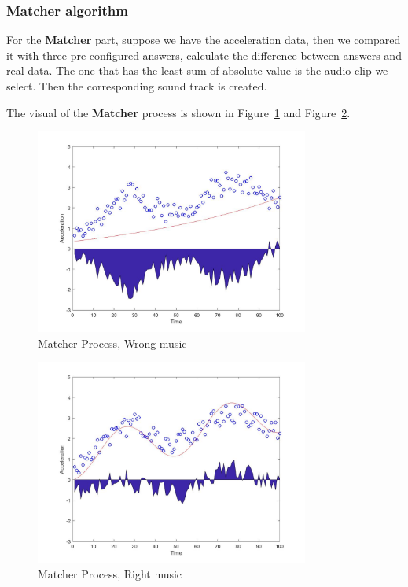 \subsubsection{Matcher algorithm}

For the \textbf{Matcher} part, suppose we have the acceleration data, then we
compared it with three pre-configured answers, calculate the difference between
answers and real data. The one that has the least sum of absolute value is the
audio clip we select. Then the corresponding sound track is created. 

The visual of the \textbf{Matcher} process is shown in Figure~\ref{matcherStep0}
and Figure~\ref{matcherStep1}.


\newcommand{\widthOfMatcherFigure}{9cm}

\begin{figure}[H]
\centering
\includegraphics[width=\widthOfMatcherFigure]{figWR/matcher1}
\caption{Matcher Process, Wrong music}
\label{matcherStep0}
\end{figure}

\begin{figure}[H]
\centering
\includegraphics[width=\widthOfMatcherFigure]{figWR/matcher2}
\caption{Matcher Process, Right music}
\label{matcherStep1}
\end{figure}


